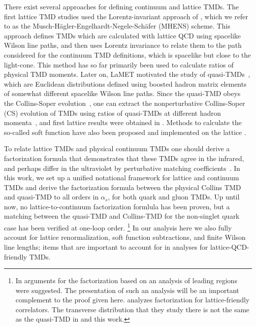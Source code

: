 \documentclass[11pt,a4paper]{article}
\begin{document}
There exist several approaches for defining continuum and lattice TMDs.
The first lattice TMD studies used the Lorentz-invariant approach of , which we refer to as the Musch-H\"agler-Engelhardt-Negele-Sch\"afer (MHENS) scheme.
This approach defines TMDs which are calculated with lattice QCD using spacelike Wilson line paths, and then uses Lorentz invariance to relate them to the path considered for the continuum TMD definitions, which is spacelike but close to the light-cone. This method has so far primarily been used to calculate ratios of physical TMD moments.
Later on, LaMET motivated the study of quasi-TMDs~\cite{Ji:2014hxa,Ji:2018hvs,Ebert:2018gzl,Ebert:2019okf,Ebert:2019tvc,Ji:2019sxk,Ji:2019ewn,Ebert:2020gxr,Ji:2020jeb,Ji:2021znw}, which are Euclidean distributions defined using boosted hadron matrix elements of somewhat different spacelike Wilson line paths. 
Since the quasi-TMD obeys the Collins-Soper evolution~\cite{Ji:2014hxa},
one can extract the nonperturbative Collins-Soper (CS) evolution of TMDs using ratios of quasi-TMDs at different hadron momenta~\cite{Ebert:2018gzl}, and first lattice results were obtained in .
Methods to calculate the so-called soft function have also been proposed \cite{Ji:2019sxk} and implemented on the lattice \cite{LatticeParton:2020uhz,Li:2021wvl}.

To relate lattice TMDs and physical continuum TMDs  one should derive a factorization formula that demonstrates that these TMDs agree in the infrared, and perhaps differ in the ultraviolet by perturbative matching coefficients~\cite{Ji:2014hxa,Ji:2018hvs,Ebert:2019okf,Ji:2019ewn,Ji:2020jeb,Vladimirov:2020ofp}. 
In this work, we set up a unified notational framework for lattice and continuum TMDs and derive the factorization formula between the physical Collins TMD and quasi-TMD to all orders in $\alpha_s$, for both quark and gluon TMDs. 
Up until now, no lattice-to-continuum factorization formlula has been proven, but a matching between the quasi-TMD and Collins-TMD for the non-singlet quark case has been verified at one-loop order.%
\footnote{
	In  arguments for the factorization based on an analysis of leading regions were suggested. The presentation of such an analysis will be an important complement to the proof given here.
	 analyzes factorization for lattice-friendly correlators. 
	The transverse distribution that they study there is not the same as the quasi-TMD in  and this work. } 
In our analysis here we also fully account for lattice renormalization, soft function subtractions, and finite Wilson line lengths; items that are important to account for in analyses for lattice-QCD-friendly TMDs.
\end{document}
